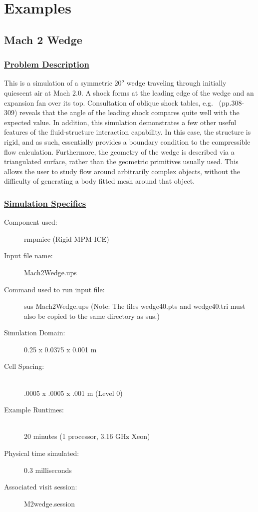 \newpage

\section{Examples}

\subsection*{\center Mach 2 Wedge}
\subsubsection*{\underline{Problem Description}}
This is a simulation of a symmetric $20^o$ wedge traveling through initially
quiescent air at Mach 2.0.  A shock forms at the leading edge of the
wedge and an expansion fan over its top.  Consultation of oblique shock
tables, e.g.~\cite{ref:Saad} (pp.308-309) reveals that the angle of the leading
shock compares quite well with the expected value.  In addition, this
simulation demonstrates a few other useful features of the fluid-structure
interaction capability.  In this case, the structure is rigid, and as
such, essentially provides a boundary condition to the compressible flow
calculation.  Furthermore, the geometry of the wedge is described via a
triangulated surface, rather than the geometric primitives usually used.
This allows the user to study flow around arbitrarily complex objects,
without the difficulty of generating a body fitted mesh around that object.

\subsubsection*{\underline{Simulation Specifics}}
\begin{description}
\item [Component used:] \hfill rmpmice (Rigid MPM-ICE)
\item [Input file name:] \hfill Mach2Wedge.ups
\item [Command used to run input file:]\hfill sus Mach2Wedge.ups
(Note: The files wedge40.pts and wedge40.tri must also be copied to
the same directory as sus.)

\item [Simulation Domain:]\hfill    0.25 x 0.0375 x 0.001 m

\item [Cell Spacing:]\hfill \\
.0005 x .0005 x .001 m (Level 0)

\item [Example Runtimes:] \hfill \\
 20 minutes   (1 processor, 3.16 GHz Xeon)\\

\item [Physical time simulated:] \hfill 0.3 milliseconds

\item [Associated visit session:] \hfill M2wedge.session

\end{description}

